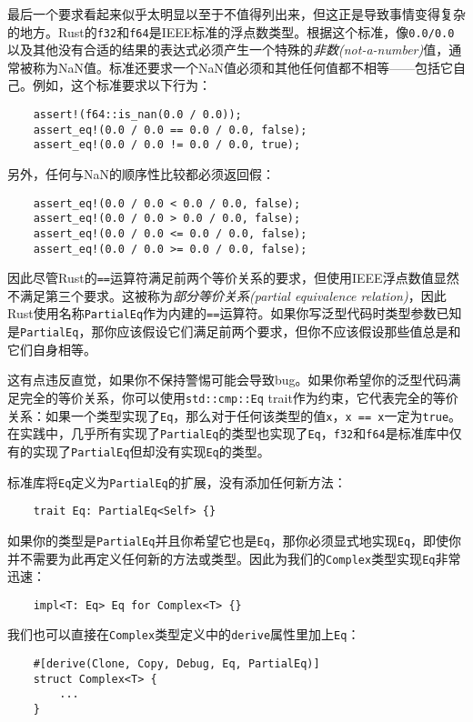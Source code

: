最后一个要求看起来似乎太明显以至于不值得列出来，但这正是导致事情变得复杂的地方。Rust的\texttt{f32}和\texttt{f64}是IEEE标准的浮点数类型。根据这个标准，像\texttt{0.0/0.0}以及其他没有合适的结果的表达式必须产生一个特殊的\emph{非数(not-a-number)}值，通常被称为NaN值。标准还要求一个NaN值必须和其他任何值都不相等——包括它自己。例如，这个标准要求以下行为：
\begin{verbatim}
    assert!(f64::is_nan(0.0 / 0.0));
    assert_eq!(0.0 / 0.0 == 0.0 / 0.0, false);
    assert_eq!(0.0 / 0.0 != 0.0 / 0.0, true);
\end{verbatim}

另外，任何与NaN的顺序性比较都必须返回假：
\begin{verbatim}
    assert_eq!(0.0 / 0.0 < 0.0 / 0.0, false);
    assert_eq!(0.0 / 0.0 > 0.0 / 0.0, false);
    assert_eq!(0.0 / 0.0 <= 0.0 / 0.0, false);
    assert_eq!(0.0 / 0.0 >= 0.0 / 0.0, false);
\end{verbatim}

因此尽管Rust的\texttt{==}运算符满足前两个等价关系的要求，但使用IEEE浮点数值显然不满足第三个要求。这被称为\emph{部分等价关系(partial equivalence relation)}，因此Rust使用名称\texttt{PartialEq}作为内建的\texttt{==}运算符。如果你写泛型代码时类型参数已知是\texttt{PartialEq}，那你应该假设它们满足前两个要求，但你不应该假设那些值总是和它们自身相等。

这有点违反直觉，如果你不保持警惕可能会导致bug。如果你希望你的泛型代码满足完全的等价关系，你可以使用\texttt{std::cmp::Eq} trait作为约束，它代表完全的等价关系：如果一个类型实现了\texttt{Eq}，那么对于任何该类型的值\texttt{x}，\texttt{x == x}一定为\texttt{true}。在实践中，几乎所有实现了\texttt{PartialEq}的类型也实现了\texttt{Eq}，\texttt{f32}和\texttt{f64}是标准库中仅有的实现了\texttt{PartialEq}但却没有实现\texttt{Eq}的类型。

标准库将\texttt{Eq}定义为\texttt{PartialEq}的扩展，没有添加任何新方法：
\begin{verbatim}
    trait Eq: PartialEq<Self> {}
\end{verbatim}

如果你的类型是\texttt{PartialEq}并且你希望它也是\texttt{Eq}，那你必须显式地实现\texttt{Eq}，即使你并不需要为此再定义任何新的方法或类型。因此为我们的\texttt{Complex}类型实现\texttt{Eq}非常迅速：
\begin{verbatim}
    impl<T: Eq> Eq for Complex<T> {}
\end{verbatim}

我们也可以直接在\texttt{Complex}类型定义中的\texttt{derive}属性里加上\texttt{Eq}：
\begin{verbatim}
    #[derive(Clone, Copy, Debug, Eq, PartialEq)]
    struct Complex<T> {
        ...
    }
\end{verbatim}

